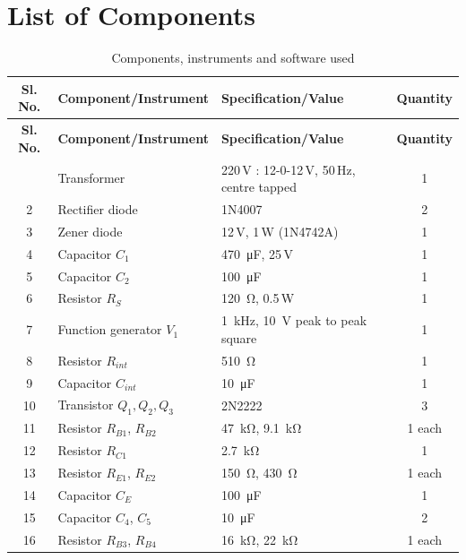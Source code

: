 \documentclass[12pt,a4paper]{article}
\begin{document}
	\section{List of Components}
	\begin{longtable}{|c|l|l|c|}
		\caption{Components, instruments and software used}
		\label{tab:components}\\
		\hline
		\rowcolor{black!12}\textbf{Sl. No.} & \textbf{Component/Instrument} & \textbf{Specification/Value} & \textbf{Quantity} \\
		\hline
		\endfirsthead
		\hline
		\rowcolor{black!12}\textbf{Sl. No.} & \textbf{Component/Instrument} & \textbf{Specification/Value} & \textbf{Quantity} \\
		\hline
		\endhead
		\hline
		\endlastfoot
		1 & Transformer & 220\,V : 12-0-12\,V, 50\,Hz, centre tapped & 1 \\
		\hline
		2 & Rectifier diode & 1N4007 & 2 \\
		\hline
		3 & Zener diode & 12\,V, 1\,W (1N4742A) & 1 \\
		\hline
		4 & Capacitor $C_1$ & \SI{470}{\micro\farad}, 25\,V & 1 \\
		\hline
		5 & Capacitor $C_2$ & \SI{100}{\micro\farad} & 1 \\
		\hline
		6 & Resistor $R_S$ & \SI{120}{\ohm}, 0.5\,W & 1 \\
		\hline
		7 & Function generator $V_1$ & \SI{1}{\kilo\hertz}, \SI{10}{\volt} peak to peak square & 1 \\
		\hline
		8 & Resistor $R_{int}$ & \SI{510}{\ohm} & 1 \\
		\hline
		9 & Capacitor $C_{int}$ & \SI{10}{\micro\farad} & 1 \\
		\hline
		10 & Transistor $Q_1,Q_2,Q_3$ & 2N2222 & 3 \\
		\hline
		11 & Resistor $R_{B1}$, $R_{B2}$ & \SI{47}{\kilo\ohm}, \SI{9.1}{\kilo\ohm} & 1 each \\
		\hline
		12 & Resistor $R_{C1}$ & \SI{2.7}{\kilo\ohm} & 1 \\
		\hline
		13 & Resistor $R_{E1}$, $R_{E2}$ & \SI{150}{\ohm}, \SI{430}{\ohm} & 1 each \\
		\hline
		14 & Capacitor $C_E$ & \SI{100}{\micro\farad} & 1 \\
		\hline
		15 & Capacitor $C_4$, $C_5$ & \SI{10}{\micro\farad} & 2 \\
		\hline
		16 & Resistor $R_{B3}$, $R_{B4}$ & \SI{16}{\kilo\ohm}, \SI{22}{\kilo\ohm} & 1 each \\

\end{longtable}
\end{document}
